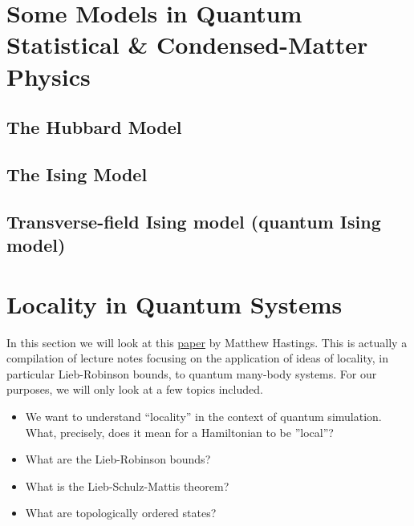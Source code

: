 \documentclass{book}
\theoremstyle{definition}
\begin{document}
\section{Some Models in Quantum Statistical \& Condensed-Matter Physics}

\subsection{The Hubbard Model}

\subsection{The Ising Model}




\subsection{Transverse-field Ising model (quantum Ising model)}











\newpage




\section{Locality in Quantum Systems}

In this section we will look at this \href{https://arxiv.org/pdf/1008.5137.pdf}{\underline{paper}} by Matthew Hastings. This is actually a compilation of lecture notes focusing on the application of ideas of locality, in particular Lieb-Robinson bounds, to quantum many-body systems. For our purposes, we will only look at a few topics included. 
\begin{itemize}
	\item We want to understand ``locality'' in the context of quantum simulation. What, precisely, does it mean for a Hamiltonian to be ''local''? 
	
	\item What are the Lieb-Robinson bounds? 
	
	\item What is the Lieb-Schulz-Mattis theorem?
	
	\item What are topologically ordered states? 
\end{itemize}
\end{document}
